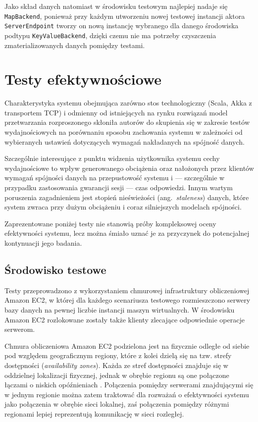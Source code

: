 Jako skład danych natomiast w środowisku testowym najlepiej nadaje się \texttt{MapBackend}, ponieważ przy każdym utworzeniu nowej testowej instancji aktora \texttt{ServerEndpoint} tworzy on nową instancję wybranego dla danego środowiska podtypu \texttt{KeyValueBackend}, dzięki czemu nie ma potrzeby czyszczenia zmaterializowanych danych pomiędzy testami.

\section{Testy efektywnościowe} \label{section:perftests}

Charakterystyka systemu obejmująca zarówno stos technologiczny (Scala, Akka z transportem TCP) i odmienny od istniejących na rynku rozwiązań model przetwarzania rozproszonego skłoniła autorów do skupienia się w zakresie testów wydajnościowych na porównaniu sposobu zachowania systemu w zależności od wybieranych ustawień dotyczących wymagań nakładanych na spójność danych.

Szczególnie interesujące z punktu widzenia użytkownika systemu cechy wydajnościowe to wpływ
generowanego obciążenia oraz nałożonych przez klientów wymagań spójności danych na przepustowość
systemu i --- szczególnie w przypadku zastosowania gwarancji sesji --- czas odpowiedzi. Innym wartym
poruszenia zagadnieniem jest stopień nieświeżości (ang.\ \textit{staleness}) danych, które system zwraca przy dużym obciążeniu i coraz silniejszych modelach spójności.

Zaprezentowane poniżej testy nie stanowią próby kompleksowej oceny efektywności systemu, lecz można śmiało uznać je za przyczynek do potencjalnej kontynuacji jego badania.

\subsection{Środowisko testowe}

Testy przeprowadzono z wykorzystaniem chmurowej infrastruktury obliczeniowej Amazon EC2, w której dla każdego scenariusza testowego rozmieszczono serwery bazy danych na pewnej liczbie instancji maszyn wirtualnych. W środowisku Amazon EC2 rozlokowane zostały także klienty zlecające odpowiednie operacje serwerom.

Chmura obliczeniowa Amazon EC2 podzielona jest na fizycznie odległe od siebie pod względem geograficznym regiony, które z kolei dzielą się na tzw. strefy dostępności (\textit{availability zones}). Każda ze stref dostępności znajduje się w oddzielnej lokalizacji fizycznej, jednak w obrębie regionu są one połączone łączami o niskich opóźnieniach \cite{ec2}. Połączenia pomiędzy serwerami znajdującymi się w jednym regionie można zatem traktować dla rozważań o efektywności systemu jako połączenia w obrębie sieci lokalnej, zaś połączenia pomiędzy różnymi regionami lepiej reprezentują komunikację w sieci rozległej.

